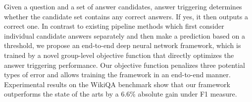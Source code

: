 Given a question and a set of answer candidates, answer triggering determines whether the candidate set contains any correct answers. If yes, it then outputs a correct one. In contrast to existing pipeline methods which first consider individual candidate answers separately and then make a prediction based on a threshold, we propose an end-to-end deep neural network framework, which is trained by a novel group-level objective function that directly optimizes the answer triggering performance. Our objective function penalizes three potential types of error and allows training the framework in an end-to-end manner. Experimental results on the WikiQA benchmark show that our framework outperforms the state of the arts by a 6.6\% absolute gain under F1 measure.
